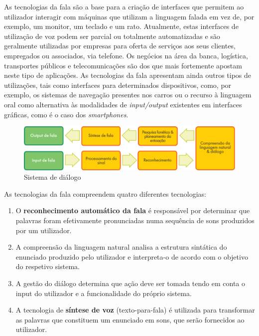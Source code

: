 \begin{multicols}{2}
 As tecnologias da fala são a base para a criação de interfaces que permitem ao utilizador interagir com máquinas que utilizam a linguagem falada em vez de, por exemplo, um monitor, um teclado e um rato. Atualmente, estas interfaces de utilização de voz podem ser parcial ou totalmente automatizadas e são geralmente utilizadas por empresas para oferta de serviços aos seus clientes, empregados ou associados, via telefone. Os negócios na área da banca, logística, transportes públicos e telecomunicações são dos que mais fortemente apostam neste tipo de aplicações. As tecnologias da fala apresentam ainda outros tipos de utilizações, tais como interfaces para determinados dispositivos, como, por exemplo, os sistemas de navegação presentes nos carros ou o recurso à linguagem oral como alternativa às mo\-da\-li\-da\-des de \textit{input/output} existentes em interfaces gráficas, como é o caso dos \textit{smartphones}.


\begin{figure}[htb]
  \center 
  \includegraphics[width=\textwidth]{../_media/portuguese/simple_speech-based_dialogue_architecture}
  \caption{Sistema de diálogo}
  \label{fig:dialoguearch_de}
\end{figure}

As tecnologias da fala compreendem quatro diferentes tecnologias:

\begin{enumerate}
  \item O \textbf{reconhecimento automático da fala} é responsável por determinar que palavras foram efetivamente pronunciadas numa sequência de sons produzidos por um utilizador.
      \item A compreensão da linguagem natural analisa a estrutura sintática do enunciado produzido pelo utilizador e interpreta-o de acordo com o objetivo do respetivo sistema.
      \item A gestão do diálogo determina que ação deve ser tomada tendo em conta o input do utilizador e a funcionalidade do próprio sistema.
      \item A tecnologia de \textbf{síntese de voz} (texto-para-fala) é utilizada para transformar as palavras que constituem um enunciado em sons, que serão fornecidos ao utilizador.
\end{enumerate}


\end{multicols}
